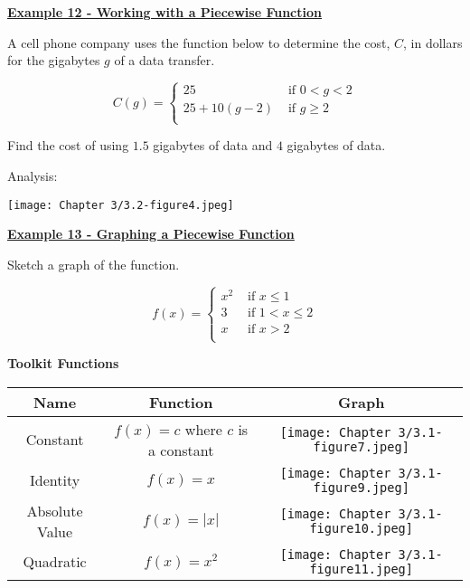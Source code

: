 \documentclass[12pt]{book}
\begin{document}
\underline{\textbf{Example 12 - Working with a Piecewise Function}}

A cell phone company uses the function below to determine the cost, $C$, in dollars for the gigabytes $g$ of a data transfer. 

$$ C(g) =  \begin{cases} 
   25 & \text{ if }  0 < g < 2 \\ 
   25+ 10(g-2) & \text{ if } g \geq 2 \\ 
    \end{cases} $$

Find the cost of using $1.5$ gigabytes of data and $4$ gigabytes of data. 

\vspace{70mm}

Analysis: 

\centerline{ \texttt{[image: Chapter 3/3.2-figure4.jpeg]}}

\newpage
\underline{\textbf{Example 13 - Graphing a Piecewise Function}}

Sketch a graph of the function. 


$$ f(x) =  \begin{cases} 
   x^2 & \text{ if }  x \leq 1 \\ 
   3 & \text{ if } 1 < x \leq 2 \\ 
    x & \text{ if }  x > 2 \\ 
    \end{cases} $$



\newpage


\textbf{Toolkit Functions}
\\

 \begin{tabular}{ |c|c|c| } 
         \hline
              \textbf{Name} & \textbf{Function} & \textbf{Graph} \\
             \hline
             Constant & $f(x)=c$ where $c$ is a constant & \texttt{[image: Chapter 3/3.1-figure7.jpeg]} \\
             \hline
            Identity & $f(x)=x$ & \texttt{[image: Chapter 3/3.1-figure9.jpeg]}\\
            \hline
            Absolute Value & $f(x)=|x|$ & \texttt{[image: Chapter 3/3.1-figure10.jpeg]} \\
            \hline
             Quadratic & $f(x)=x^2$ & \texttt{[image: Chapter 3/3.1-figure11.jpeg]}\\
            \hline
          \end{tabular} 
\end{document}
